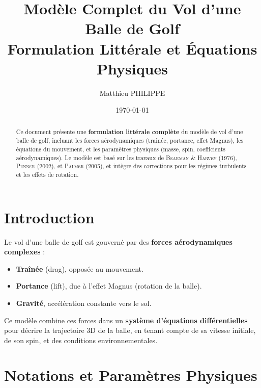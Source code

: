 \documentclass[11pt, a4paper]{article}
\title{\textbf{Modèle Complet du Vol d'une Balle de Golf} \\
       \large{Formulation Littérale et Équations Physiques}}
\author{Matthieu PHILIPPE}
\date{\today}
\begin{document}
\maketitle

\begin{abstract}
Ce document présente une \textbf{formulation littérale complète} du modèle de vol d'une balle de golf, incluant les forces aérodynamiques (traînée, portance, effet Magnus), les équations du mouvement, et les paramètres physiques (masse, spin, coefficients aérodynamiques). Le modèle est basé sur les travaux de \textsc{Bearman \& Harvey (1976)}, \textsc{Penner (2002)}, et \textsc{Palmer (2005)}, et intègre des corrections pour les régimes turbulents et les effets de rotation.
\end{abstract}



\section{Introduction}
Le vol d'une balle de golf est gouverné par des \textbf{forces aérodynamiques complexes} :
\begin{itemize}
    \item \textbf{Traînée} (drag), opposée au mouvement.
    \item \textbf{Portance} (lift), due à l'effet Magnus (rotation de la balle).
    \item \textbf{Gravité}, accélération constante vers le sol.
\end{itemize}
Ce modèle combine ces forces dans un \textbf{système d'équations différentielles} pour décrire la trajectoire 3D de la balle, en tenant compte de sa vitesse initiale, de son spin, et des conditions environnementales.



\section{Notations et Paramètres Physiques}
\label{sec:parameters}
\end{document}
